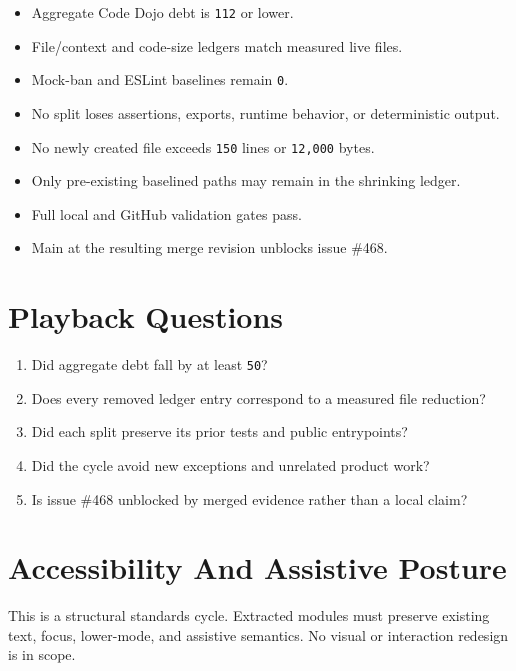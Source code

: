 \begin{itemize}
\tightlist
\item
  Aggregate Code Dojo debt is \texttt{1\allowbreak{}1\allowbreak{}2} or lower.
\item
  File/context and code-size ledgers match measured live files.
\item
  Mock-ban and ESLint baselines remain \texttt{0}.
\item
  No split loses assertions, exports, runtime behavior, or deterministic output.
\item
  No newly created file exceeds \texttt{1\allowbreak{}5\allowbreak{}0} lines or \texttt{1\allowbreak{}2\allowbreak{},\allowbreak{}0\allowbreak{}0\allowbreak{}0} bytes.
\item
  Only pre-existing baselined paths may remain in the shrinking ledger.
\item
  Full local and GitHub validation gates pass.
\item
  Main at the resulting merge revision unblocks issue \#468.
\end{itemize}

\section{Playback Questions}\label{record-245-playback-questions}

\begin{enumerate}
\def\labelenumi{\arabic{enumi}.}
\tightlist
\item
  Did aggregate debt fall by at least \texttt{5\allowbreak{}0}?
\item
  Does every removed ledger entry correspond to a measured file reduction?
\item
  Did each split preserve its prior tests and public entrypoints?
\item
  Did the cycle avoid new exceptions and unrelated product work?
\item
  Is issue \#468 unblocked by merged evidence rather than a local claim?
\end{enumerate}

\section{Accessibility And Assistive Posture}\label{record-245-accessibility-and-assistive-posture}

This is a structural standards cycle. Extracted modules must preserve existing text, focus, lower-mode, and assistive semantics. No visual or interaction redesign is in scope.

